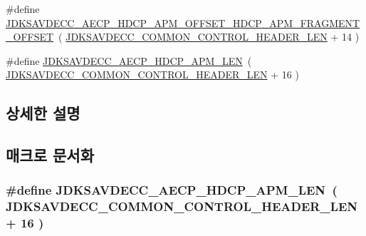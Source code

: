 \begin{DoxyCompactItemize}
\item 
\#define \hyperlink{group__aecpdu__hdcp__apm__offsets_gae24d3361203e24baf1955d6fbe708192}{J\+D\+K\+S\+A\+V\+D\+E\+C\+C\+\_\+\+A\+E\+C\+P\+\_\+\+H\+D\+C\+P\+\_\+\+A\+P\+M\+\_\+\+O\+F\+F\+S\+E\+T\+\_\+\+H\+D\+C\+P\+\_\+\+A\+P\+M\+\_\+\+F\+R\+A\+G\+M\+E\+N\+T\+\_\+\+O\+F\+F\+S\+ET}~( \hyperlink{group__jdksavdecc__avtp__common__control__header_gaae84052886fb1bb42f3bc5f85b741dff}{J\+D\+K\+S\+A\+V\+D\+E\+C\+C\+\_\+\+C\+O\+M\+M\+O\+N\+\_\+\+C\+O\+N\+T\+R\+O\+L\+\_\+\+H\+E\+A\+D\+E\+R\+\_\+\+L\+EN} + 14 )
\item 
\#define \hyperlink{group__aecpdu__hdcp__apm__offsets_ga398cb2211a991cd82dc0959069c78d88}{J\+D\+K\+S\+A\+V\+D\+E\+C\+C\+\_\+\+A\+E\+C\+P\+\_\+\+H\+D\+C\+P\+\_\+\+A\+P\+M\+\_\+\+L\+EN}~( \hyperlink{group__jdksavdecc__avtp__common__control__header_gaae84052886fb1bb42f3bc5f85b741dff}{J\+D\+K\+S\+A\+V\+D\+E\+C\+C\+\_\+\+C\+O\+M\+M\+O\+N\+\_\+\+C\+O\+N\+T\+R\+O\+L\+\_\+\+H\+E\+A\+D\+E\+R\+\_\+\+L\+EN} + 16 )
\end{DoxyCompactItemize}


\subsection{상세한 설명}


\subsection{매크로 문서화}
\subsubsection[{\texorpdfstring{J\+D\+K\+S\+A\+V\+D\+E\+C\+C\+\_\+\+A\+E\+C\+P\+\_\+\+H\+D\+C\+P\+\_\+\+A\+P\+M\+\_\+\+L\+EN}{JDKSAVDECC_AECP_HDCP_APM_LEN}}]{\setlength{\rightskip}{0pt plus 5cm}\#define J\+D\+K\+S\+A\+V\+D\+E\+C\+C\+\_\+\+A\+E\+C\+P\+\_\+\+H\+D\+C\+P\+\_\+\+A\+P\+M\+\_\+\+L\+EN~( {\bf J\+D\+K\+S\+A\+V\+D\+E\+C\+C\+\_\+\+C\+O\+M\+M\+O\+N\+\_\+\+C\+O\+N\+T\+R\+O\+L\+\_\+\+H\+E\+A\+D\+E\+R\+\_\+\+L\+EN} + 16 )}\hypertarget{group__aecpdu__hdcp__apm__offsets_ga398cb2211a991cd82dc0959069c78d88}{}\label{group__aecpdu__hdcp__apm__offsets_ga398cb2211a991cd82dc0959069c78d88}


